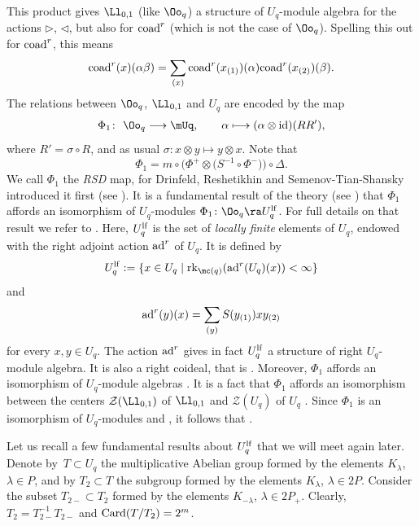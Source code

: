 This product gives $\Ll_{0,1}$ (like $\Oo_q$) a structure of $U_q$-module algebra for the actions $\rhd$, $\lhd$, but also for ${\rm coad}^r$ (which is not the case of $\Oo_q$). Spelling this out for ${\rm coad}^r$, this means
\[{\rm coad}^r(x)(\alpha\beta)=\sum_{(x)}{\rm coad}^r(x_{(1)})(\alpha){\rm coad}^r(x_{(2)})(\beta).\]
The relations between $\Oo_q$, $\Ll_{0,1}$ and $U_q$ are encoded by the map
\begin{equation}\label{phi1def}
\Phi_1\colon\ \Oo_q\longrightarrow \mUq, \qquad \alpha\longmapsto(\alpha \otimes {\rm id})(RR'),
\end{equation}
where $R' = \sigma\circ R$, and as usual $\sigma\colon x\otimes y \mapsto y\otimes x$. Note that
\begin{equation}\label{RSDmapdef}
\Phi_1 = m\circ \big(\Phi^+\otimes \big(S^{-1}\circ \Phi^-{}\big)\big)\circ \Delta.
\end{equation}
We call $\Phi_1$ the {\it RSD} map, for Drinfeld, Reshetikhin and Semenov-Tian-Shansky introduced it first (see \cite{Dr,Maj,RSTS}). It is a fundamental result of the theory (see \cite{Bau1,Ca,Jos}) that $\Phi_1$ affords an isomorphism of $U_q$-modules
$\Phi_1\colon \Oo_q \ra U_q^{\rm lf}$.
For full details on that result we refer to \cite[Section 3.12]{VY}. Here, $U_q^{\rm lf}$ is the set of \emph{locally finite} elements of $U_q$, endowed with the right adjoint action ${\rm ad}^r$ of $U_q$. It is defined by
\[U_q^{\rm lf} :=\{x\in U_q\mid {\rm rk}_{\mc(q)}({\rm ad}^r(U_q)(x)) < \infty\}\]
and
\[{\rm ad}^r(y)(x) = \sum_{(y)}{S}(y_{(1)}) x y_{(2)}\]
for every $x,y \in U_q$. The action ${\rm ad}^r$ gives in fact $U_q^{\rm lf}$ a structure of right $U_q$-module algebra. It is also a right coideal, that is . Moreover, $\Phi_1$ affords an isomorphism of $U_q$-module algebras .
It is a fact that $\Phi_1$ affords an isomorphism between the centers $\mathcal{Z}(\Ll_{0,1})$ of $\Ll_{0,1}$ and $\mathcal{Z}(U_q)$ of $U_q$ \cite[Proposition~6.24]{BR}. Since $\Phi_1$ is an isomorphism of $U_q$-modules and , it follows that .

Let us recall a few fundamental results about $U_q^{\rm lf}$ that we will meet again later. Denote by~${T\subset U_q}$ the multiplicative Abelian group formed by the elements $K_{\lambda}$, $\lambda \in P$, and by $T_2\subset T$ the subgroup formed by the elements $K_{\lambda}$, $\lambda \in 2P$. Consider the subset $T_{2-} \subset T_2$ formed by the elements $K_{-\lambda}$, $\lambda \in 2P_+$. Clearly, $T_2 = T_{2-}^{-1}T_{2-}$ and ${\rm Card}(T/T_2) = 2^m$.

